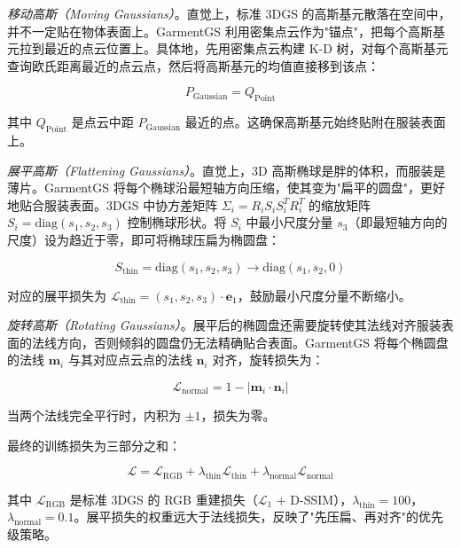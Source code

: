 \emph{移动高斯（Moving Gaussians）}。直觉上，标准 3DGS 的高斯基元散落在空间中，并不一定贴在物体表面上。GarmentGS 利用密集点云作为"锚点"，把每个高斯基元拉到最近的点云位置上。具体地，先用密集点云构建 K-D 树，对每个高斯基元查询欧氏距离最近的点云点，然后将高斯基元的均值直接移到该点：

\begin{equation}
P_{\text{Gaussian}} = Q_{\text{Point}}
\end{equation}

其中 $Q_{\text{Point}}$ 是点云中距 $P_{\text{Gaussian}}$ 最近的点。这确保高斯基元始终贴附在服装表面上。

\emph{展平高斯（Flattening Gaussians）}。直觉上，3D 高斯椭球是胖的体积，而服装是薄片。GarmentGS 将每个椭球沿最短轴方向压缩，使其变为"扁平的圆盘"，更好地贴合服装表面。3DGS 中协方差矩阵 $\Sigma_i = R_i S_i S_i^T R_i^T$ 的缩放矩阵 $S_i = \text{diag}(s_1, s_2, s_3)$ 控制椭球形状。将 $S_i$ 中最小尺度分量 $s_3$（即最短轴方向的尺度）设为趋近于零，即可将椭球压扁为椭圆盘：

\begin{equation}
S_{\text{thin}} = \text{diag}(s_1, s_2, s_3) \rightarrow \text{diag}(s_1, s_2, 0)
\end{equation}

对应的展平损失为 $\mathcal{L}_{\text{thin}} = (s_1, s_2, s_3) \cdot \mathbf{e}_1$，鼓励最小尺度分量不断缩小。

\emph{旋转高斯（Rotating Gaussians）}。展平后的椭圆盘还需要旋转使其法线对齐服装表面的法线方向，否则倾斜的圆盘仍无法精确贴合表面。GarmentGS 将每个椭圆盘的法线 $\mathbf{m}_i$ 与其对应点云点的法线 $\mathbf{n}_i$ 对齐，旋转损失为：

\begin{equation}
\mathcal{L}_{\text{normal}} = 1 - |\mathbf{m}_i \cdot \mathbf{n}_i|
\end{equation}

当两个法线完全平行时，内积为 $\pm 1$，损失为零。

最终的训练损失为三部分之和：

\begin{equation}
\mathcal{L} = \mathcal{L}_{\text{RGB}} + \lambda_{\text{thin}} \mathcal{L}_{\text{thin}} + \lambda_{\text{normal}} \mathcal{L}_{\text{normal}}
\end{equation}

其中 $\mathcal{L}_{\text{RGB}}$ 是标准 3DGS 的 RGB 重建损失（$\mathcal{L}_1$ + D-SSIM），$\lambda_{\text{thin}} = 100$，$\lambda_{\text{normal}} = 0.1$。展平损失的权重远大于法线损失，反映了"先压扁、再对齐"的优先级策略。

